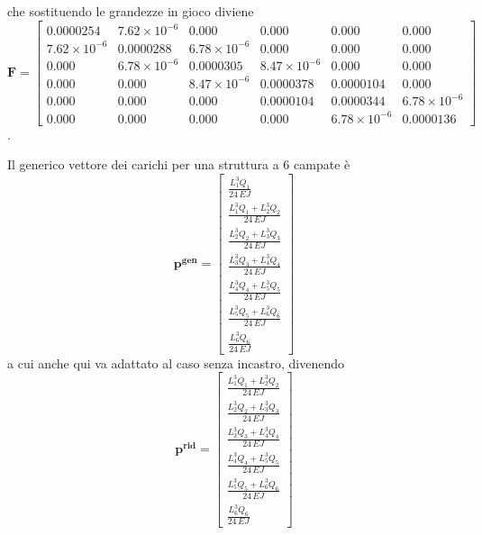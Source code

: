 che sostituendo le grandezze in gioco diviene
\begin{equation}
\mathbf{F}=
\begin{bmatrix}
0.0000254 & 7.62 \times 10^{-6} & 0.000 & 0.000 & 0.000 & 0.000 \\
7.62 \times 10^{-6} & 0.0000288 & 6.78 \times 10^{-6} & 0.000 & 0.000 & 0.000 \\
0.000 & 6.78 \times 10^{-6} & 0.0000305 & 8.47 \times 10^{-6} & 0.000 & 0.000 \\
0.000 & 0.000 & 8.47 \times 10^{-6} & 0.0000378 & 0.0000104 & 0.000 \\
0.000 & 0.000 & 0.000 & 0.0000104 & 0.0000344 & 6.78 \times 10^{-6} \\
0.000 & 0.000 & 0.000 & 0.000 & 6.78 \times 10^{-6} & 0.0000136
\end{bmatrix}
\end{equation}.

Il generico vettore dei carichi per una struttura a 6 campate è
\begin{equation}
\mathbf{p^{gen}}=
\begin{bmatrix}
\frac{L_{1}^{3} Q_{1}}{24 \, \mathit{EJ}} \\
\frac{L_{1}^{3} Q_{1} + L_{2}^{3} Q_{2}}{24 \, \mathit{EJ}} \\
\frac{L_{2}^{3} Q_{2} + L_{3}^{3} Q_{3}}{24 \, \mathit{EJ}} \\
\frac{L_{3}^{3} Q_{3} + L_{4}^{3} Q_{4}}{24 \, \mathit{EJ}} \\
\frac{L_{4}^{3} Q_{4} + L_{5}^{3} Q_{5}}{24 \, \mathit{EJ}} \\
\frac{L_{5}^{3} Q_{5} + L_{6}^{3} Q_{6}}{24 \, \mathit{EJ}} \\
\frac{L_{6}^{3} Q_{6}}{24 \, \mathit{EJ}}
\end{bmatrix}
\end{equation}
a cui anche qui va adattato al caso senza incastro, divenendo
\begin{equation}
\mathbf{p^{rid}}=
\begin{bmatrix}
\frac{L_{1}^{3} Q_{1} + L_{2}^{3} Q_{2}}{24 \, \mathit{EJ}} \\
\frac{L_{2}^{3} Q_{2} + L_{3}^{3} Q_{3}}{24 \, \mathit{EJ}} \\
\frac{L_{3}^{3} Q_{3} + L_{4}^{3} Q_{4}}{24 \, \mathit{EJ}} \\
\frac{L_{4}^{3} Q_{4} + L_{5}^{3} Q_{5}}{24 \, \mathit{EJ}} \\
\frac{L_{5}^{3} Q_{5} + L_{6}^{3} Q_{6}}{24 \, \mathit{EJ}} \\
\frac{L_{6}^{3} Q_{6}}{24 \, \mathit{EJ}}
\end{bmatrix}
\end{equation}


